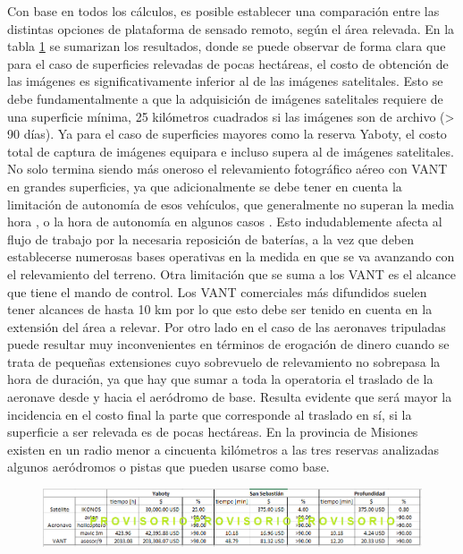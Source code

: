 Con base en todos los cálculos, es posible establecer una comparación entre las distintas opciones de plataforma de sensado remoto, según el área relevada.
En la tabla \ref{Tabla} se sumarizan los resultados, donde se puede observar de forma clara que para el caso de superficies relevadas de pocas hectáreas, el costo de obtención de las imágenes es significativamente inferior al de las imágenes satelitales. Esto se debe fundamentalmente a que la adquisición de imágenes satelitales requiere de una superficie mínima, 25 kilómetros cuadrados si las imágenes son de archivo (> 90 días)\cite{noauthor_satellite_2020}. Ya para el caso de superficies mayores como la reserva Yaboty, el costo total de captura de imágenes equipara e incluso supera al de imágenes satelitales. No solo termina siendo más oneroso el relevamiento fotográfico aéreo con VANT en grandes superficies, ya que adicionalmente se debe tener en cuenta la limitación de autonomía de esos vehículos, que generalmente no superan la media hora \cite{}, o la hora de autonomía en algunos casos \cite{}. Esto indudablemente afecta al flujo de trabajo por la necesaria reposición de baterías, a la vez que deben establecerse numerosas bases operativas en la medida en que se va avanzando con el relevamiento del terreno. Otra limitación que se suma a los VANT es el alcance que tiene el mando de control. Los VANT comerciales más difundidos suelen tener alcances de hasta 10 km \cite{} por lo que esto debe ser tenido en cuenta en la extensión del área a relevar. Por otro lado en el caso de las aeronaves tripuladas puede resultar muy inconvenientes en términos de erogación de dinero cuando se trata de pequeñas extensiones cuyo sobrevuelo de relevamiento no sobrepasa la hora de duración, ya que hay que sumar a toda la operatoria el traslado de la aeronave desde y hacia el aeródromo de base. Resulta evidente que será mayor la incidencia en el costo final la parte que corresponde al traslado en sí, si la superficie a ser relevada es de pocas hectáreas. En la provincia de Misiones existen en un radio menor a cincuenta kilómetros a las tres reservas analizadas algunos aeródromos o pistas que pueden usarse como base.
\begin{figure}
    \includegraphics[width=\textwidth]{Imagenes/Tabla comparativa borrador.png}
     \hfill
        \label{Tabla}
\end{figure}
